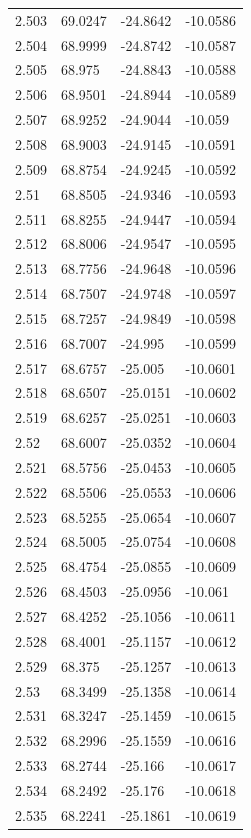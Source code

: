 \begin{tabular}{llll}
2.503 & 69.0247 & -24.8642 & -10.0586 \\
2.504 & 68.9999 & -24.8742 & -10.0587 \\
2.505 & 68.975 & -24.8843 & -10.0588 \\
2.506 & 68.9501 & -24.8944 & -10.0589 \\
2.507 & 68.9252 & -24.9044 & -10.059 \\
2.508 & 68.9003 & -24.9145 & -10.0591 \\
2.509 & 68.8754 & -24.9245 & -10.0592 \\
2.51 & 68.8505 & -24.9346 & -10.0593 \\
2.511 & 68.8255 & -24.9447 & -10.0594 \\
2.512 & 68.8006 & -24.9547 & -10.0595 \\
2.513 & 68.7756 & -24.9648 & -10.0596 \\
2.514 & 68.7507 & -24.9748 & -10.0597 \\
2.515 & 68.7257 & -24.9849 & -10.0598 \\
2.516 & 68.7007 & -24.995 & -10.0599 \\
2.517 & 68.6757 & -25.005 & -10.0601 \\
2.518 & 68.6507 & -25.0151 & -10.0602 \\
2.519 & 68.6257 & -25.0251 & -10.0603 \\
2.52 & 68.6007 & -25.0352 & -10.0604 \\
2.521 & 68.5756 & -25.0453 & -10.0605 \\
2.522 & 68.5506 & -25.0553 & -10.0606 \\
2.523 & 68.5255 & -25.0654 & -10.0607 \\
2.524 & 68.5005 & -25.0754 & -10.0608 \\
2.525 & 68.4754 & -25.0855 & -10.0609 \\
2.526 & 68.4503 & -25.0956 & -10.061 \\
2.527 & 68.4252 & -25.1056 & -10.0611 \\
2.528 & 68.4001 & -25.1157 & -10.0612 \\
2.529 & 68.375 & -25.1257 & -10.0613 \\
2.53 & 68.3499 & -25.1358 & -10.0614 \\
2.531 & 68.3247 & -25.1459 & -10.0615 \\
2.532 & 68.2996 & -25.1559 & -10.0616 \\
2.533 & 68.2744 & -25.166 & -10.0617 \\
2.534 & 68.2492 & -25.176 & -10.0618 \\
2.535 & 68.2241 & -25.1861 & -10.0619 \\

\end{tabular}

